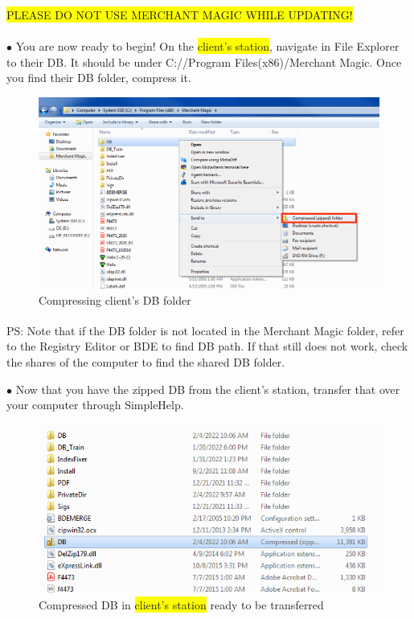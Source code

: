 \documentclass[a4paper, 11pt]{article}
\begin{document}
\pagebreak

\vspace*{\fill}
\colorbox{yellow}{ PLEASE DO NOT USE MERCHANT MAGIC WHILE UPDATING!}\\\\
$\bullet$ You are now ready to begin! On the \colorbox{yellow}{client's station}, navigate in File Explorer to their DB. It should be under C://Program Files(x86)/Merchant Magic. Once you find their DB folder, compress it.

\begin{figure}[h]
    \centering
     \includegraphics[width=\textwidth]{capture 7}
    \caption{Compressing client's DB folder}
\end{figure}
PS: Note that if the DB folder is not located in the Merchant Magic\textsuperscript{\textregistered} folder, refer to the Registry Editor or BDE to find DB path. If that still does not work, check the shares of the computer to find the shared DB folder. 
\vspace*{\fill}

\pagebreak

\vspace*{\fill}
$\bullet$ Now that you have the zipped DB from the client's station, transfer that over your computer through SimpleHelp.

\begin{figure}[h]
    \centering
    \includegraphics[width=\textwidth]{capture 8}
    \caption{Compressed DB in \colorbox{yellow}{client's station} ready to be transferred}
\end{figure}
\vspace*{\fill}
\end{document}
